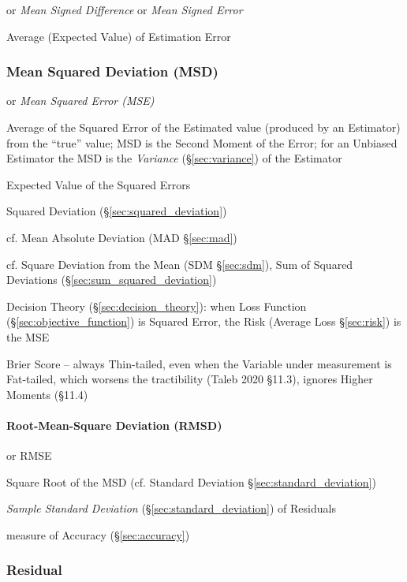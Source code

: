 or \emph{Mean Signed Difference} or \emph{Mean Signed Error}

Average (Expected Value) of Estimation Error



\subsubsection{Mean Squared Deviation (MSD)}\label{sec:msd}

or \emph{Mean Squared Error (MSE)}

Average of the Squared Error of the Estimated value (produced by an Estimator)
from the ``true'' value; MSD is the Second Moment of the Error; for an Unbiased
Estimator the MSD is the \emph{Variance} (\S\ref{sec:variance}) of the Estimator

Expected Value of the Squared Errors

Squared Deviation (\S\ref{sec:squared_deviation})

cf. Mean Absolute Deviation (MAD \S\ref{sec:mad})

cf. Square Deviation from the Mean (SDM \S\ref{sec:sdm}), Sum of Squared
Deviations (\S\ref{sec:sum_squared_deviation})

\fist Decision Theory (\S\ref{sec:decision_theory}): when Loss Function
(\S\ref{sec:objective_function}) is Squared Error, the Risk (Average Loss
\S\ref{sec:risk}) is the MSE

Brier Score -- always Thin-tailed, even when the Variable under measurement is
Fat-tailed, which worsens the tractibility (Taleb 2020 \S 11.3), ignores Higher
Moments (\S 11.4)



\paragraph{Root-Mean-Square Deviation (RMSD)}\label{sec:rmsd}\hfill

or RMSE

Square Root of the MSD (cf. Standard Deviation \S\ref{sec:standard_deviation})

\emph{Sample Standard Deviation} (\S\ref{sec:standard_deviation}) of Residuals

measure of Accuracy (\S\ref{sec:accuracy})



\subsubsection{Residual}\label{sec:residual}

